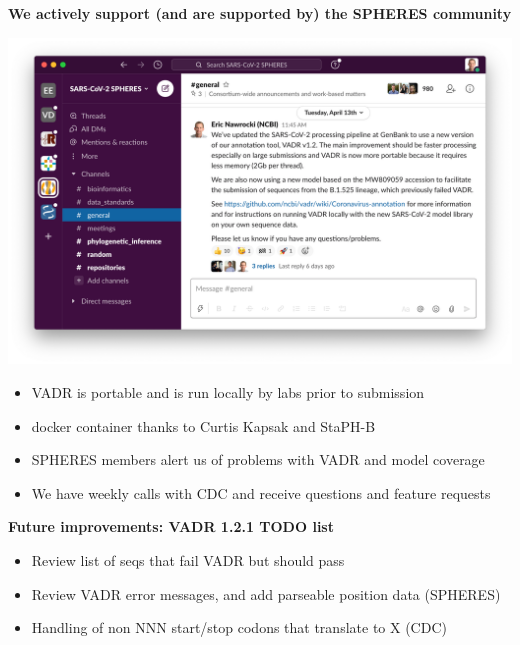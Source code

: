 \documentclass[landscape]{slides}
\begin{document}
\begin{slide}
\begin{center}
\Large{\textbf{We actively support (and are supported by) the SPHERES community}}

\includegraphics[width=8in]{figs/spheres-slack-apr132021}

\begin{itemize}
\item VADR is portable and is run locally by labs prior to submission
\item docker container thanks to Curtis Kapsak and StaPH-B
\item SPHERES members alert us of problems with VADR and model coverage
\item We have weekly calls with CDC and receive questions and feature requests
\end{itemize}

\end{center}

\vfill
\end{slide}
\begin{slide}
\begin{center}
\Large{\textbf{Future improvements: VADR 1.2.1 TODO list}}

\begin{itemize}
\item Review list of seqs that fail VADR but should pass
\item Review VADR error messages, and add parseable position data (SPHERES)
\item Handling of non NNN start/stop codons that translate to X (CDC)
\end{itemize}

\end{center}

\vfill
\end{slide}
\end{document}

